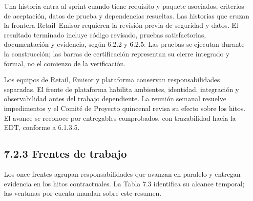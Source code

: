 \documentclass[11pt]{article}
\begin{document}
Una historia entra al sprint cuando tiene requisito y paquete asociados, criterios de aceptación, datos de prueba y dependencias resueltas. Las historias que cruzan la frontera Retail–Emisor requieren la revisión previa de seguridad y datos. El resultado terminado incluye código revisado, pruebas satisfactorias, documentación y evidencia, según 6.2.2 y 6.2.5. Las pruebas se ejecutan durante la construcción; las barras de certificación representan su cierre integrado y formal, no el comienzo de la verificación.

Los equipos de Retail, Emisor y plataforma conservan responsabilidades separadas. El frente de plataforma habilita ambientes, identidad, integración y observabilidad antes del trabajo dependiente. La reunión semanal resuelve impedimentos y el Comité de Proyecto quincenal revisa su efecto sobre los hitos. El avance se reconoce por entregables comprobados, con trazabilidad hacia la EDT, conforme a 6.1.3.5.

\subsection{7.2.3 Frentes de trabajo}

Los once frentes agrupan responsabilidades que avanzan en paralelo y entregan evidencia en los hitos contractuales. La Tabla 7.3 identifica su alcance temporal; las ventanas por cuenta mandan sobre este resumen.
\end{document}
